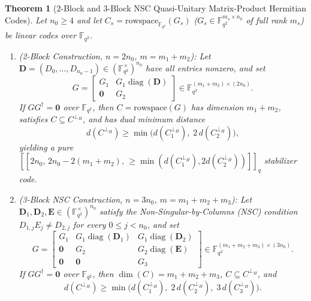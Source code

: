 \documentclass[11pt,a4paper]{article}
\newcommand{\vb}[1]{\symbf{#1}}
\newcommand{\vb}[1]{\mathbf{#1}}
\newtheorem{theorem}{Theorem}
\theoremstyle{remark}
\begin{document}
\begin{theorem}[2-Block and 3-Block NSC Quasi-Unitary Matrix-Product Hermitian Codes]\label{thm:mp23}
Let $n_0 \ge 4$ and let $C_s = \mathrm{rowspace}_{\mathbb{F}_{q^2}}(G_s)$ ($G_s \in \mathbb{F}_{q^2}^{m_s \times n_0}$ of full rank $m_s$) be linear codes over $\mathbb{F}_{q^2}$.
\begin{enumerate}
  \item \emph{(2-Block Construction, $n = 2n_0$, $m = m_1 + m_2$):} Let $\vb{D} = (D_0, \dots, D_{n_0-1}) \in (\mathbb{F}_{q^2}^\times)^{n_0}$ have all entries nonzero, and set
  \[
    G = \begin{bmatrix} G_1 & G_1 \operatorname{diag}(\vb{D}) \\ \vb{0} & G_2 \end{bmatrix} \in \mathbb{F}_{q^2}^{(m_1 + m_2) \times (2n_0)}.
  \]
  If $G G^\dagger = \vb{0}$ over $\mathbb{F}_{q^2}$, then $C = \mathrm{rowspace}(G)$ has dimension $m_1 + m_2$, satisfies $C \subseteq C^{\perp_H}$, and has dual minimum distance
  \begin{equation}\label{eq:mp2_dist}
    d(C^{\perp_H}) \ge \min\!\bigl(d(C_1^{\perp_H}),\; 2\, d(C_2^{\perp_H})\bigr),
  \end{equation}
  yielding a pure $[[2n_0,\, 2n_0 - 2(m_1 + m_2),\, \ge \min(d(C_1^{\perp_H}), 2d(C_2^{\perp_H}))]]_q$ stabilizer code.
  \item \emph{(3-Block NSC Construction, $n = 3n_0$, $m = m_1 + m_2 + m_3$):} Let $\vb{D}_1, \vb{D}_2, \vb{E} \in (\mathbb{F}_{q^2}^\times)^{n_0}$ satisfy the Non-Singular-by-Columns (NSC) condition $D_{1,j} E_j \ne D_{2,j}$ for every $0 \le j < n_0$, and set
  \[
    G = \begin{bmatrix}
      G_1 & G_1 \operatorname{diag}(\vb{D}_1) & G_1 \operatorname{diag}(\vb{D}_2) \\
      \vb{0} & G_2 & G_2 \operatorname{diag}(\vb{E}) \\
      \vb{0} & \vb{0} & G_3
    \end{bmatrix} \in \mathbb{F}_{q^2}^{(m_1 + m_2 + m_3) \times (3n_0)}.
  \]
  If $G G^\dagger = \vb{0}$ over $\mathbb{F}_{q^2}$, then $\dim(C) = m_1 + m_2 + m_3$, $C \subseteq C^{\perp_H}$, and
  \begin{equation}\label{eq:mp3_dist}
    d(C^{\perp_H}) \ge \min\!\bigl(d(C_1^{\perp_H}),\; 2\, d(C_2^{\perp_H}),\; 3\, d(C_3^{\perp_H})\bigr).
  \end{equation}
\end{enumerate}
\end{theorem}
\end{document}
